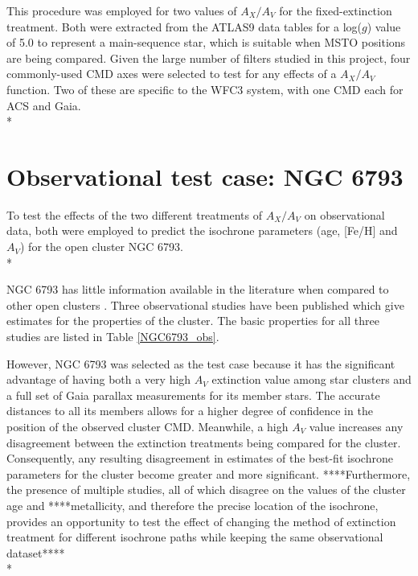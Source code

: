 \documentclass[12pt, a4paper]{report}
\begin{document}
This procedure was employed for two values of $A_{X}/A_{V}$ for the fixed-extinction treatment. Both were extracted from the ATLAS9 data tables for a log($g$) value of 5.0 to represent a main-sequence star, which is suitable when MSTO positions are being compared. Given the large number of filters studied in this project, four commonly-used CMD axes were selected to test for any effects of a $A_{X}/A_{V}$ function. Two of these are specific to the WFC3 system, with one CMD each for ACS and Gaia.\\*

\section{Observational test case: NGC 6793} \label{obs_ngc_section}
To test the effects of the two different treatments of $A_{X}/A_{V}$ on observational data, both were employed to predict the isochrone parameters (age, [Fe/H] and $A_{V}$) for the open cluster NGC 6793.\\*

NGC 6793 has little information available in the literature when compared to other open clusters \citep{2019A&A...623A.108B}. Three observational studies have been published which give estimates for the properties of the cluster. The basic properties for all three studies are listed in Table \ref{NGC6793_obs}.


However, NGC 6793 was selected as the test case because it has the significant advantage of having both a very high $A_{V}$ extinction value among star clusters and a full set of Gaia parallax measurements for its member stars. The accurate distances to all its members allows for a higher degree of confidence in the position of the observed cluster CMD. Meanwhile, a high $A_{V}$ value increases any disagreement between the extinction treatments being compared for the cluster. Consequently, any resulting disagreement in estimates of the best-fit isochrone parameters for the cluster become greater and more significant. ****Furthermore, the presence of multiple studies, all of which disagree on the values of the cluster age and ****metallicity, and therefore the precise location of the isochrone, provides an opportunity to test the effect of changing the method of extinction treatment for different isochrone paths while keeping the same observational dataset****  \\*
\end{document}

